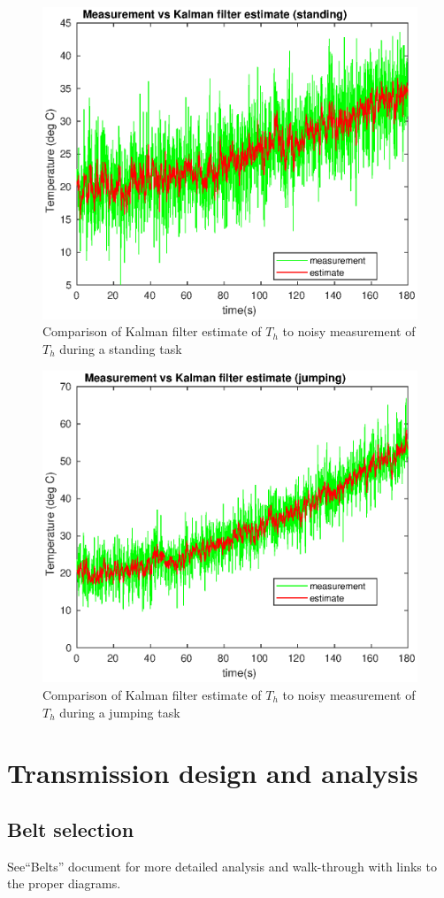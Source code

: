 \documentclass{report}
\begin{document}
\begin{figure}[H]
	\centering
	\includegraphics[width=0.7\linewidth]{thermal/Kalman_vs_meas_standing.eps}
	\caption{Comparison of Kalman filter estimate of $T_h$ to noisy measurement of $T_h$ during a standing task}
	\label{fig:meas_vs_Kalman_est_standing}
\end{figure}

\begin{figure}[H]
	\centering
	\includegraphics[width=0.7\linewidth]{thermal/Kalman_vs_meas_jumping.eps}
	\caption{Comparison of Kalman filter estimate of $T_h$ to noisy measurement of $T_h$ during a jumping task}
	\label{fig:meas_vs_Kalman_est_jumping}
\end{figure}

\section[Transmission design and analysis]{Transmission design and analysis}
\subsection[Belt selection]{Belt selection}
See``Belts'' document for more detailed analysis and walk-through with links to the proper diagrams.
\end{document}

